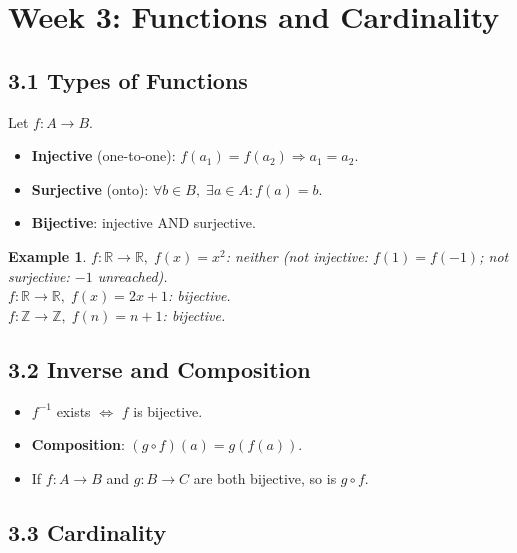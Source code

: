 \documentclass[11pt]{article}
\newtheorem{example}[definition]{Example}
\newcommand{\Z}{\mathbb{Z}}
\newcommand{\R}{\mathbb{R}}
\begin{document}
\newpage
\section{Week 3: Functions and Cardinality}
\setcounter{definition}{0}

\subsection*{3.1 Types of Functions}

\begin{tcolorbox}[keybox={Injective / Surjective / Bijective}]
Let $f:A\to B$.
\begin{itemize}[nosep]
  \item \textbf{Injective} (one-to-one): $f(a_1)=f(a_2)\Rightarrow a_1=a_2$.
  \item \textbf{Surjective} (onto): $\forall b\in B,\;\exists a\in A: f(a)=b$.
  \item \textbf{Bijective}: injective AND surjective.
\end{itemize}
\end{tcolorbox}

\begin{example}
$f:\R\to\R,\;f(x)=x^2$: neither (not injective: $f(1)=f(-1)$; not surjective: $-1$ unreached).\\
$f:\R\to\R,\;f(x)=2x+1$: bijective.\\
$f:\Z\to\Z,\;f(n)=n+1$: bijective.
\end{example}

\subsection*{3.2 Inverse and Composition}

\begin{itemize}[nosep]
  \item $f^{-1}$ exists $\Leftrightarrow$ $f$ is bijective.
  \item \textbf{Composition}: $(g\circ f)(a)=g(f(a))$.
  \item If $f:A\to B$ and $g:B\to C$ are both bijective, so is $g\circ f$.
\end{itemize}

\subsection*{3.3 Cardinality}
\end{document}
